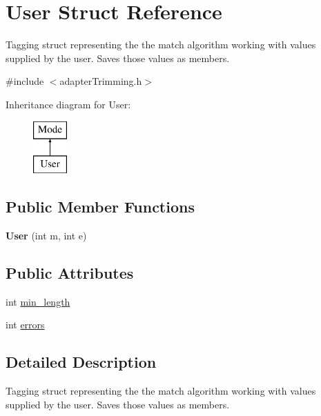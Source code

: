 \hypertarget{struct_user}{\section{User Struct Reference}
\label{struct_user}
}


Tagging struct representing the the match algorithm working with values supplied by the user. Saves those values as members.  




{\ttfamily \#include $<$adapter\-Trimming.\-h$>$}

Inheritance diagram for User\-:\begin{figure}[H]
\begin{center}
\leavevmode
\includegraphics[height=2.000000cm]{struct_user}
\end{center}
\end{figure}
\subsection*{Public Member Functions}
\begin{DoxyCompactItemize}
\item 
\hypertarget{struct_user_a522ee72180516ce491c9e495530a6f34}{{\bfseries User} (int m, int e)}\label{struct_user_a522ee72180516ce491c9e495530a6f34}

\end{DoxyCompactItemize}
\subsection*{Public Attributes}
\begin{DoxyCompactItemize}
\item 
int \hyperlink{struct_user_ae94113fb04b477ed27af1e0fe9e7822e}{min\-\_\-length}
\item 
int \hyperlink{struct_user_a8622c0446a3a49852b69c5d558a62d7c}{errors}
\end{DoxyCompactItemize}


\subsection{Detailed Description}
Tagging struct representing the the match algorithm working with values supplied by the user. Saves those values as members. 

